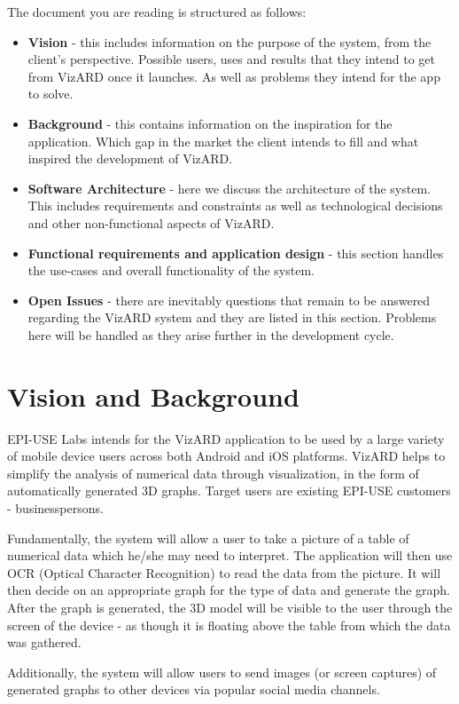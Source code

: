 \documentclass[a4paper,12pt]{article}
\begin{document}
The document you are reading is structured as follows:
\begin{itemize}
	\item \textbf{Vision} - this includes information on the purpose of the system, from the client's perspective. Possible users, uses and results that they intend to get from VizARD once it launches. As well as problems they intend for the app to solve.
	\item \textbf{Background} - this contains information on the inspiration for the application. Which gap in the market the client intends to fill and what inspired the development of VizARD.
	\item \textbf{Software Architecture} - here we discuss the architecture of the system.
	This includes requirements and constraints as well as technological decisions and other non-functional aspects of VizARD.
	\item \textbf{Functional requirements and application design} - this section handles the use-cases and overall functionality of the system.
	\item \textbf{Open Issues} - there are inevitably questions that remain to be answered regarding the VizARD system and they are listed in this section. Problems here will be handled as they arise further in the development cycle.
\end{itemize}

\newpage
\section{Vision and Background}
EPI-USE Labs intends for the VizARD application to be used by a large variety of mobile device users across both Android and iOS platforms. VizARD helps to simplify the analysis of numerical data through visualization, in the form of automatically generated 3D graphs. Target users are existing EPI-USE customers - businesspersons.

Fundamentally, the system will allow a user to take a picture of a table of numerical data which he/she may need to interpret. The application will then use OCR (Optical Character Recognition) to read the data from the picture. It will then decide on an appropriate graph for the type of data and generate the graph. After the graph is generated, the 3D model will be visible to the user through the screen of the device - as though it is floating above the table from which the data was gathered.

Additionally, the system will allow users to send images (or screen captures) of generated graphs to other devices via popular social media channels.
\end{document}
